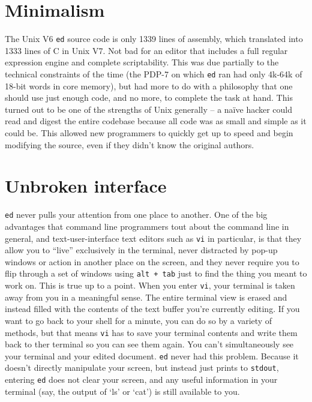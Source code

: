 \documentclass[12pt]{article}
\begin{document}
\section{Minimalism}

The Unix V6 \lstinline{ed} source code is only 1339 lines of assembly, which translated into 1333 lines of C in Unix V7.
Not bad for an editor that includes a full regular expression engine
and complete scriptability. This was due partially to the technical constraints
of the time (the PDP-7 on which \lstinline{ed} ran had only 4k-64k of 18-bit words in core memory),
but had more to do with a philosophy that one should use just enough code,
and no more, to complete the task at hand. This turned out to be one of the
strengths of Unix generally -- a naïve hacker could read and digest the entire
codebase because all code was as small and simple as it could be. This allowed
new programmers to quickly get up to speed and begin modifying the source, even
if they didn't know the original authors.

\section{Unbroken interface}

\lstinline{ed} never pulls your attention from one place to another.
One of the big advantages that command line programmers tout about
the command line in general, and text-user-interface text editors
such as \lstinline{vi} in particular, is that they allow you to
``live'' exclusively in the terminal, never distracted
by pop-up windows or action in another place on the screen,
and they never require you to flip through a set of windows using
\lstinline{alt + tab} just to find the thing you meant to work on.
This is true up to a point. When you enter \lstinline{vi},
your terminal is taken away from you in a meaningful sense. The entire
terminal view is erased and instead filled with the contents of the
text buffer you're currently editing. If you want to go back to your shell
for a minute, you can do so by a variety of methods, but that means
\lstinline{vi} has to save your terminal contents and write them
back to ther terminal so you can see them again. You can't simultaneously
see your terminal and your edited document. \lstinline{ed} never had
this problem. Because it doesn't directly manipulate your
screen, but instead just prints to \lstinline{stdout}, entering
\lstinline{ed} does not clear your screen, and any useful
information in your terminal (say, the output of `ls' or `cat')
is still available to you.
\end{document}
